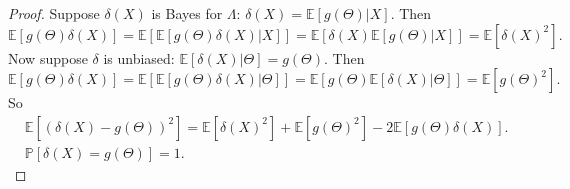 \documentclass[a4paper]{article}
\begin{document}
\begin{proof}
	Suppose $\delta(X)$ is Bayes for $\Lambda$: $\delta(X) = \mathbb{E}[g(\Theta)|X]$. Then
	\begin{equation*}
		\mathbb{E}[g(\Theta)\delta(X)] = \mathbb{E}[\mathbb{E}[g(\Theta)\delta(X)|X]] = \mathbb{E}[\delta(X)\mathbb{E}[g(\Theta)|X]] = \mathbb{E}[\delta(X)^2].
	\end{equation*}
	Now suppose $\delta$ is unbiased: $\mathbb{E}[\delta(X)|\Theta] = g(\Theta)$. Then
	\begin{equation*}
		\mathbb{E}[g(\Theta)\delta(X)] = \mathbb{E}[\mathbb{E}[g(\Theta)\delta(X)|\Theta]] = \mathbb{E}[g(\Theta)\mathbb{E}[\delta(X)|\Theta]] = \mathbb{E}[g(\Theta)^2].
	\end{equation*}
	So
	\begin{equation}
		\begin{aligned}
			& \mathbb{E}[(\delta(X)-g(\Theta))^2] = \mathbb{E}[\delta(X)^2] + \mathbb{E}[g(\Theta)^2] - 2\mathbb{E}[g(\Theta)\delta(X)]. \\
			& \mathbb{P}[\delta(X)=g(\Theta)]=1.
		\end{aligned}
	\end{equation}
\end{proof}
\end{document}

